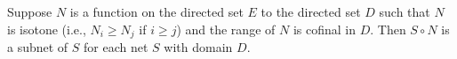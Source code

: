 Suppose $N$ is a function on the directed set $E$ to the directed set $D$ such that $N$ is isotone (i.e., $N_i \geq N_j$ if $i \geq j$) and the range of $N$ is cofinal in $D$. Then $S \circ N$ is a subnet of $S$ for each net $S$ with domain $D$.
